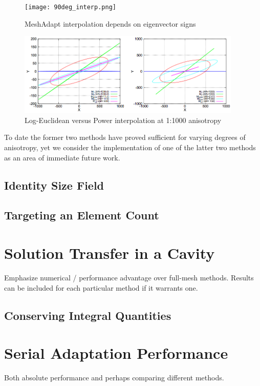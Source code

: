 \begin{figure}
\begin{center}
\texttt{[image: 90deg\_interp.png]}
\caption{MeshAdapt interpolation depends on eigenvector signs}
\label{fig:90deg_interp}
\end{center}
\end{figure}

\begin{figure}
\begin{center}
\includegraphics[width=0.95\textwidth]{log_interp.png}
\caption{Log-Euclidean versus Power interpolation
at 1:1000 anisotropy
\cite{michal2012anisotropic}}
\label{fig:log_interp}
\end{center}
\end{figure}

To date the former two methods have proved sufficient for varying
degrees of anisotropy, yet we consider the implementation of one
of the latter two methods as an area of immediate future work.

\subsection{Identity Size Field}

\subsection{Targeting an Element Count}

\section{Solution Transfer in a Cavity}

Emphasize numerical / performance advantage
over full-mesh methods.
Results can be included for each particular
method if it warrants one.

\subsection{Conserving Integral Quantities}

\section{Serial Adaptation Performance}

Both absolute performance and perhaps comparing
different methods.



